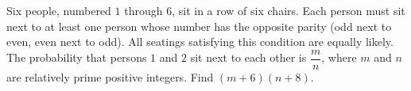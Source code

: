 Six people, numbered $1$ through $6$, sit in a row of six chairs. Each person must sit next to at least one person whose number has the opposite parity (odd next to even, even next to odd). All seatings satisfying this condition are equally likely. The probability that persons $1$ and $2$ sit next to each other is $\dfrac mn$, where $m$ and $n$ are relatively prime positive integers. Find $(m+6)(n+8)$.
